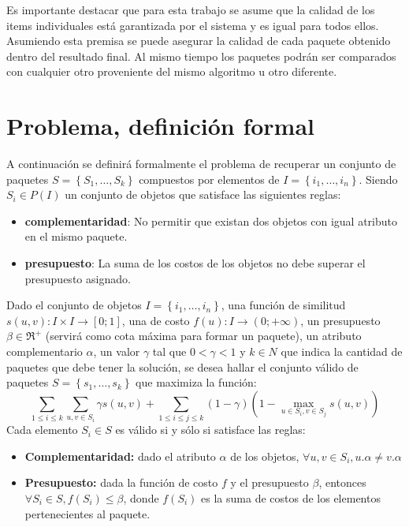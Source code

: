 Es importante destacar que para esta trabajo se asume que la calidad de los items individuales está garantizada por el sistema y es igual para todos ellos. Asumiendo esta premisa se puede asegurar la calidad de cada paquete obtenido dentro del resultado final. Al mismo tiempo los paquetes podrán ser comparados con cualquier otro proveniente del mismo algoritmo u otro diferente.

\section{Problema, definición formal}\label{introduccion:problemaFormal}
A continuación se definirá formalmente el problema de recuperar un conjunto de paquetes $S = \left\{S_1, \ldots, S_k\right\}$ compuestos por elementos de $I=\left\{i_1,\ldots, i_n\right\}$. Siendo $S_i \in P(I)$ un conjunto de objetos que satisface las siguientes reglas:
\begin{itemize}
\item \textbf{complementaridad}:  No permitir que existan dos objetos con igual atributo en el mismo paquete.
	\item \textbf{presupuesto}: La suma de los costos de los objetos no debe superar el presupuesto asignado.
\end{itemize}

Dado el conjunto de objetos $I=\left\{i_1,\ldots, i_n\right\}$, una función de similitud $s(u,v): I \times I \rightarrow [0;1]$, una de costo $f(u): I \rightarrow (0;+\infty)$, un presupuesto $\beta \in \Re^{+}$ (servirá como cota máxima para formar un paquete), un atributo complementario $\alpha$, un valor $\gamma$ tal que $0 < \gamma < 1$ y $k \in N$ que indica la cantidad de paquetes que debe tener la solución, se desea hallar el conjunto válido de paquetes $S = \left\{s_1, \ldots, s_k\right\}$ que maximiza la función:
\begin{equation} \label{des:eq-fnObj}
\sum_{1 \leq i \leq k}{\sum_{u,v \in S_i}{\gamma s(u,v)}} + \sum_{1 \leq i \leq j \leq k}{(1-\gamma) (1-\max_{u \in S_i, v \in S_j}{s(u,v)})}
\end{equation}
Cada elemento $S_i \in S$ es válido si y sólo si satisface las reglas:
\begin{itemize}
	\item \textbf{Complementaridad:} dado el atributo $\alpha$ de los objetos, $\forall u,v \in S_i, u.\alpha \neq v.\alpha$
	\item \textbf{Presupuesto:} dada la función de costo $f$ y el presupuesto $\beta$, entonces $\forall S_i \in S, f(S_i) \leq \beta$, donde $f(S_i)$ es la suma de costos de los elementos pertenecientes al paquete.
\end{itemize}		  

